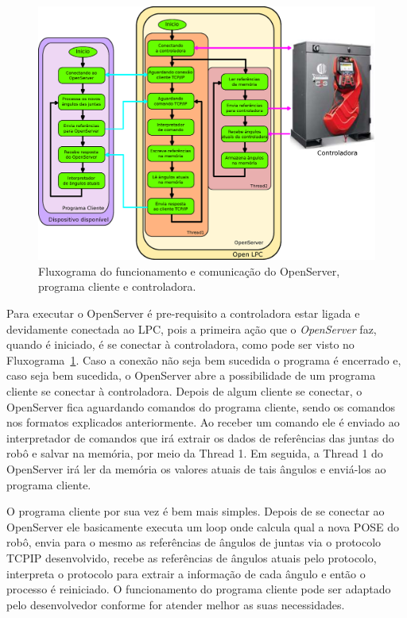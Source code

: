             \begin{figure}[ht]
                \centering
                \includegraphics[width=\columnwidth]{imagens/Softwares/infografico.eps}
                \small 
                \centering 
                \caption{Fluxograma do funcionamento e comunicação do OpenServer, programa cliente e controladora.}
                \label{fig:fluxograma}
            \end{figure}
            
            Para executar o OpenServer é pre-requisito a controladora estar ligada e devidamente conectada ao \ac{LPC}, pois a primeira ação que o \textit{OpenServer} faz, quando é iniciado, é se conectar à controladora, como pode ser visto no Fluxograma~\ref{fig:fluxograma}. Caso a conexão não seja bem sucedida o programa é encerrado e, caso seja bem sucedida, o OpenServer abre a possibilidade de um programa cliente se conectar à controladora. Depois de algum cliente se conectar, o OpenServer fica aguardando comandos do programa cliente, sendo os comandos nos formatos explicados anteriormente. Ao receber um comando ele é enviado ao interpretador de comandos que irá extrair os dados de referências das juntas do robô e salvar na memória, por meio da Thread 1. Em seguida, a Thread 1 do OpenServer irá ler da memória os valores atuais de tais ângulos e enviá-los ao programa cliente.
            
            O programa cliente por sua vez é bem mais simples. Depois de se conectar ao \textit{}{OpenServer} ele basicamente executa um loop onde calcula qual a nova POSE do robô, envia para o mesmo as referências de ângulos de juntas via o protocolo \ac{TCPIP} desenvolvido, recebe as referências de ângulos atuais pelo protocolo, interpreta o protocolo para extrair a informação de cada ângulo e então o processo é reiniciado. O funcionamento do programa cliente pode ser adaptado pelo desenvolvedor conforme for atender melhor as suas necessidades.
            
